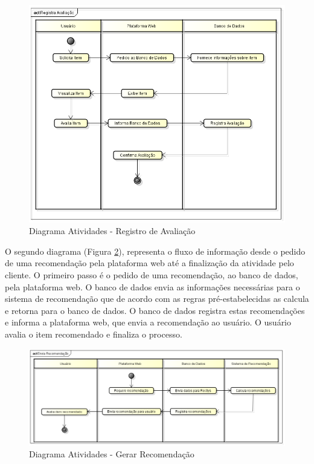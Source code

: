  \begin{figure}[htp]
    \begin{center}
    \includegraphics[width=1\textwidth]{img/Atividade_Usuario}
    \end{center}
    \label{fig:Diagrama de Atividades - Registro de Avaliacao}
    \caption{Diagrama Atividades - Registro de Avaliação}
\end{figure}

O segundo diagrama (Figura \ref{fig:Diagrama de Atividades - Recomendacao}), representa o fluxo de informação desde o pedido de uma recomendação pela plataforma web até a finalização da atividade pelo cliente. O primeiro passo é o pedido de uma recomendação, ao banco de dados, pela plataforma web. O banco de dados envia as informações necessárias para o sistema de recomendação que de acordo com as regras pré-estabelecidas as calcula e retorna para o banco de dados. O banco de dados registra estas recomendações e informa a plataforma web, que envia a recomendação ao usuário. O usuário avalia o item recomendado e finaliza o processo. 


 \begin{figure}[htp]
    \begin{center}
    \includegraphics[width=1\textwidth]{img/Atividade_Recomendacao}
    \end{center}
    \label{fig:Diagrama de Atividades - Recomendacao}
    \caption{Diagrama Atividades - Gerar Recomendação}
\end{figure}
